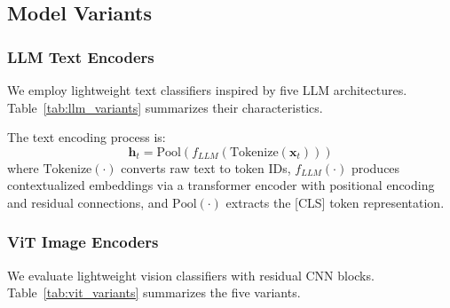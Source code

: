 \documentclass[10pt,journal,compsoc]{IEEEtran}
\begin{document}
\subsection{Model Variants}

\subsubsection{LLM Text Encoders}
We employ lightweight text classifiers inspired by five LLM architectures. Table~\ref{tab:llm_variants} summarizes their characteristics.

\begin{table}[htbp]
\centering
\caption{LLM Encoder Variants}
\label{tab:llm_variants}
\small
{}
\end{table}

The text encoding process is:
\begin{equation}
    \mathbf{h}_t = \text{Pool}(f_{LLM}(\text{Tokenize}(\mathbf{x}_t)))
    \label{eq:text_encoding}
\end{equation}
where $\text{Tokenize}(\cdot)$ converts raw text to token IDs, $f_{LLM}(\cdot)$ produces contextualized embeddings via a transformer encoder with positional encoding and residual connections, and $\text{Pool}(\cdot)$ extracts the [CLS] token representation.

\subsubsection{ViT Image Encoders}
We evaluate lightweight vision classifiers with residual CNN blocks. Table~\ref{tab:vit_variants} summarizes the five variants.
\end{document}
